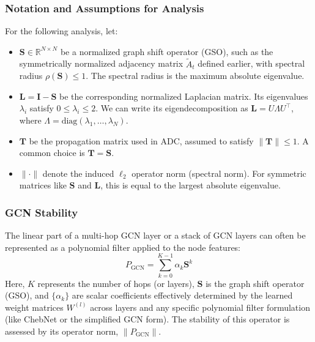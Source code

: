 \subsubsection{Notation and Assumptions for Analysis}
For the following analysis, let:
\begin{itemize}
    \item $\mathbf{S} \in \mathbb{R}^{N \times N}$ be a normalized graph shift operator (GSO), such as the symmetrically normalized adjacency matrix $\tilde{A}_t$ defined earlier, with spectral radius $\rho(\mathbf{S}) \le 1$. The spectral radius is the maximum absolute eigenvalue.
    \item $\mathbf{L} = \mathbf{I} - \mathbf{S}$ be the corresponding normalized Laplacian matrix. Its eigenvalues $\lambda_i$ satisfy $0 \le \lambda_i \le 2$. We can write its eigendecomposition as $\mathbf{L} = U \Lambda U^\top$, where $\Lambda = \mathrm{diag}(\lambda_1, \dots, \lambda_N)$.
    \item $\mathbf{T}$ be the propagation matrix used in ADC, assumed to satisfy $\|\mathbf{T}\| \le 1$. A common choice is $\mathbf{T} = \mathbf{S}$.
    \item $\|\cdot\|$ denote the induced $\ell_2$ operator norm (spectral norm). For symmetric matrices like $\mathbf{S}$ and $\mathbf{L}$, this is equal to the largest absolute eigenvalue.
\end{itemize}

\subsubsection{GCN Stability}
The linear part of a multi-hop GCN layer or a stack of GCN layers can often be represented as a polynomial filter applied to the node features:
\begin{equation}
P_{\mathrm{GCN}} = \sum_{k=0}^{K-1} \alpha_k \mathbf{S}^k
\label{eq:pgcn_poly}
\end{equation}
Here, $K$ represents the number of hops (or layers), $\mathbf{S}$ is the graph shift operator (GSO), and $\{\alpha_k\}$ are scalar coefficients effectively determined by the learned weight matrices $W^{(l)}$ across layers and any specific polynomial filter formulation (like ChebNet or the simplified GCN form). The stability of this operator is assessed by its operator norm, $\|P_{\mathrm{GCN}}\|$.


